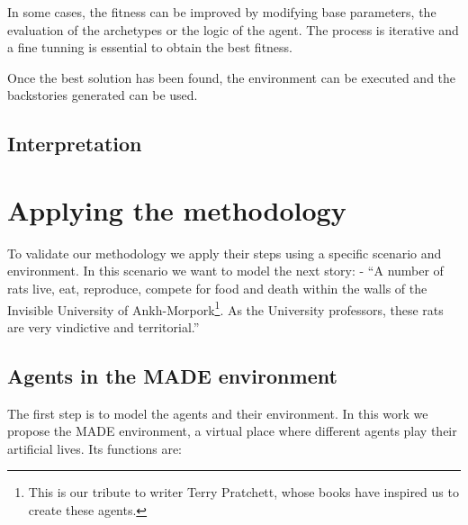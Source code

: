 \documentclass{sig-alternate}
\begin{document}
In some cases, the fitness can be improved by modifying base parameters, the evaluation of the archetypes or the logic of the agent. The process is iterative and a fine tunning is essential to obtain the best fitness.

Once the best solution has been found, the environment can be executed and the backstories generated can be used.

\subsection{Interpretation}




\section{Applying the methodology}
\label{sec:applying}

To validate our methodology we apply their steps using a specific scenario and environment. In this scenario we want to model the next story: %
 - ``A number of rats live, eat, reproduce, compete for food and death within the walls of the Invisible University of Ankh-Morpork\footnote{This is our tribute to writer Terry Pratchett, whose books have inspired us to create these agents.}. As the University professors, these rats are very vindictive and territorial.''

\subsection{Agents in the MADE environment}

The first step is to model the agents and their environment. In this work we propose the MADE environment, a virtual place where different agents play their artificial lives. Its functions are:
\end{document}

